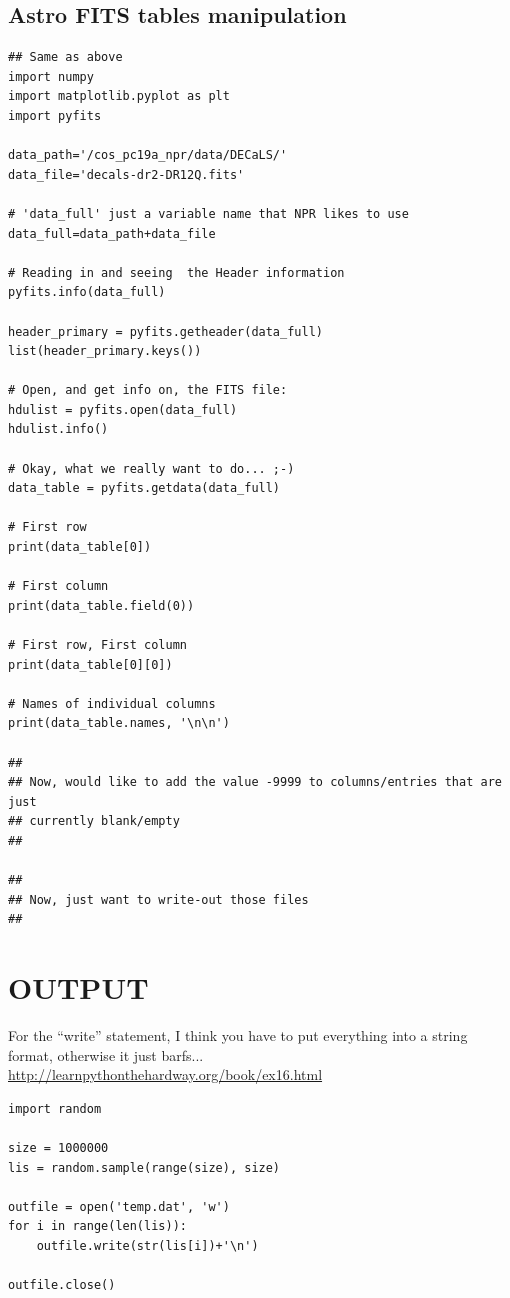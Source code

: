 \documentclass[11pt,a4paper]{article}
\begin{document}
\subsection{Astro FITS tables manipulation}
\begin{lstlisting}
## Same as above
import numpy
import matplotlib.pyplot as plt
import pyfits

data_path='/cos_pc19a_npr/data/DECaLS/'
data_file='decals-dr2-DR12Q.fits'

# 'data_full' just a variable name that NPR likes to use 
data_full=data_path+data_file

# Reading in and seeing  the Header information
pyfits.info(data_full)

header_primary = pyfits.getheader(data_full)
list(header_primary.keys())

# Open, and get info on, the FITS file:
hdulist = pyfits.open(data_full)
hdulist.info()

# Okay, what we really want to do... ;-) 
data_table = pyfits.getdata(data_full)

# First row
print(data_table[0])

# First column
print(data_table.field(0))

# First row, First column
print(data_table[0][0])

# Names of individual columns
print(data_table.names, '\n\n')

##
## Now, would like to add the value -9999 to columns/entries that are just 
## currently blank/empty
##

##
## Now, just want to write-out those files
## 
\end{lstlisting}




\newpage
\section{OUTPUT}
For the ``write'' statement, I think you have to put everything into 
a string format, otherwise it just barfs... \\
\href{http://learnpythonthehardway.org/book/ex16.html}{http://learnpythonthehardway.org/book/ex16.html}

\noindent
\begin{lstlisting}
import random

size = 1000000
lis = random.sample(range(size), size)

outfile = open('temp.dat', 'w')
for i in range(len(lis)):
    outfile.write(str(lis[i])+'\n')
    
outfile.close()
\end{lstlisting}
\end{document}
